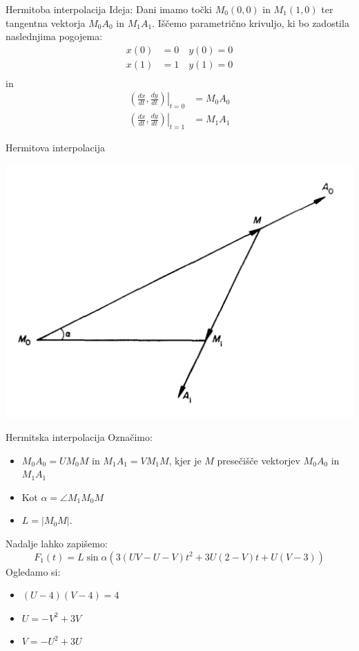 \documentclass{beamer} %
\begin{document}
\begin{frame}{Hermitoba interpolacija}
	Ideja: Dani imamo točki $M_0 (0,0)$ in $M_1 (1,0)$ ter tangentna vektorja $M_0A_0$ in $M_1A_1$. Iščemo parametrično krivuljo, ki bo zadostila naslednjima pogojema:
	\begin{align*}
		x(0) &= 0 \quad y(0) = 0 \\
		x(1) &= 1 \quad y(1) = 0 \\
	\end{align*}
in
	\begin{align*}
		 \left. \left(\frac{dx}{dt},\frac{dy}{dt}\right)\right|_{t=0} &= M_0A_0 \\
		\left.\left(\frac{dx}{dt},\frac{dy}{dt}\right)\right|_{t=1} &= M_1A_1
	\end{align*}
	 
\end{frame}

\begin{frame}{Hermitova interpolacija}
	\begin{center}
	\includegraphics[width=0.6\columnwidth]{hermit.jpg}
	\end{center}
\end{frame}

\begin{frame}{Hermitska interpolacija}
	Označimo:
	\begin{itemize}
		\item $ M_0A_0=UM_0M$ in  $M_1A_1 = VM_1M$,
		kjer je $M$ presečišče vektorjev $M_0A_0$ in $M_1A_1$
		\item Kot $\alpha =  \angle M_1M_0M$
		\item $L = |M_0M|$.
	\end{itemize}
	Nadalje lahko zapišemo:
	\[ F_1(t) =L\sin\alpha(3(UV-U-V)t^2 +3U(2-V)t+ U(V-3)) \]
	Ogledamo si:
	\begin{itemize}
		\item $(U-4)(V-4)=4$
		\item $U = -V^2 +3V$
		\item $V = -U^2 + 3U$
	\end{itemize}
	
\end{frame}
\end{document}
